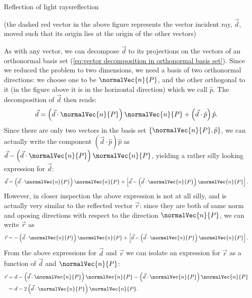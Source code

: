 \begin{example}{Reflection of light rays}{reflection}
\vspace{1em}
\centering
{}

\flushleft
(the dashed red vector in the above figure represents the vector incident ray, $\vec{d}$, moved such that its origin lies at the origin of the other vectors)

As with any vector, we can decompose $\vec{d}$ to its projections on the vectors of an orthonormal basis set (\autoref{eq:vector decomposition in orthonormal basis set}). Since we reduced the problem to two dimensions, we need a basis of two orthonormal directions: we choose one to be $\normalVec{n}{P}$, and the other orthogonal to it (in the figure above it is in the horizontal direction) which we call $\hat{p}$. The decomposition of $\vec{d}$ then reads:
\[
	\vec{d} = \left( \vec{d}\cdot\normalVec{n}{P} \right)\normalVec{n}{P} + \left( \vec{d}\cdot\hat{p} \right)\hat{p}.
\]
Since there are only two vectors in the basis set $\left\{ \normalVec{n}{P},\hat{p} \right\}$, we can actually write the component $\left( \vec{d}\cdot\hat{p} \right)\hat{p}$ as $\vec{d}-\left( \vec{d}\cdot\normalVec{n}{P} \right)\normalVec{n}{P}$, yielding a rather silly looking expression for $\vec{d}$:
\[
	\vec{d} = \left( \vec{d}\cdot\normalVec{n}{P} \right)\normalVec{n}{P} + \left[ \vec{d}-\left( \vec{d}\cdot\normalVec{n}{P} \right)\normalVec{n}{P} \right].
\]
However, in closer inspection the above expression is not at all silly, and is actually very similar to the reflected vector $\vec{r}$: since they are both of same norm and oposing directions with respect to the direction $\normalVec{n}{P}$, we can write $\vec{r}$ as
\[
	\vec{r} = -\left( \vec{d}\cdot\normalVec{n}{P} \right)\normalVec{n}{P} + \left[ \vec{d}-\left( \vec{d}\cdot\normalVec{n}{P} \right)\normalVec{n}{P} \right].
\]
From the above expressions for $\vec{d}$ and $\vec{r}$ we can isolate an expression for $\vec{r}$ as a function of $\vec{d}$ and $\normalVec{n}{P}$:
\begin{align*}
	\vec{r} &= d - \left( \vec{d}\cdot\normalVec{n}{P} \right)\normalVec{n}{P} - \left( \vec{d}\cdot\normalVec{n}{P} \right)\normalVec{n}{P}\\
	&= d-2\left( \vec{d}\cdot\normalVec{n}{P} \right)\normalVec{n}{P}.
\end{align*}
\end{example}


